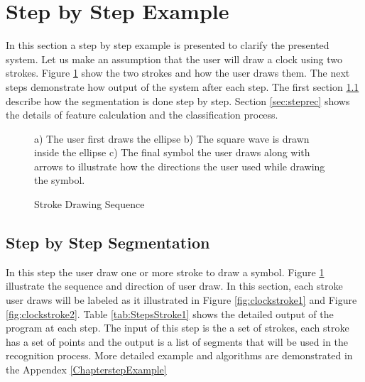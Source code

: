 

\section{Step by Step Example}
\label{secstepExample}
In this section a step by step example is presented to clarify the presented system. Let us make an assumption that the user will draw a clock using two strokes. Figure \ref{fig:clock} show the two strokes and how the user draws them. The next steps demonstrate how output of the system after each step. The first section \ref{sec:stepseg} describe how the segmentation is done step by step. Section \ref{sec:steprec} shows the details of feature calculation and the classification process. 
\begin{figure}
	\centering
	\caption{Stroke Drawing Sequence} a) The user first draws the ellipse b) The square wave is drawn inside the ellipse c) The final symbol the user draws along with arrows to illustrate how the directions the user used while drawing the symbol. 
	\label{fig:clock}
\end{figure}

\subsection{Step by Step Segmentation}
\label{sec:stepseg}

In this step the user draw one or more stroke to draw a symbol. Figure \ref{fig:clock} illustrate the sequence and direction of user draw. In this section, each stroke user draws will be labeled as it illustrated in Figure \ref{fig:clockstroke1} and Figure \ref{fig:clockstroke2}.  Table \ref{tab:StepsStroke1} shows the detailed output of the program at each step. The input of this step is the a set of strokes, each stroke has a set of  points and the output is a list of segments that will be used in the recognition process. More detailed example and algorithms are demonstrated in the Appendex \ref{ChapterstepExample} \\

